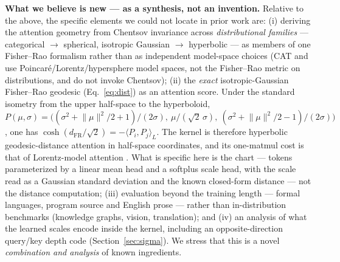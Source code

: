 \documentclass[11pt]{article}
\newcommand{\dFR}{d_{\mathrm{FR}}}
\begin{document}
\textbf{What we believe is new --- as a synthesis, not an invention.} Relative to the above, the specific elements we could not locate in prior work are: (i) deriving the attention geometry from Chentsov invariance across \emph{distributional families} --- categorical $\to$ spherical, isotropic Gaussian $\to$ hyperbolic --- as members of one Fisher--Rao formalism rather than as independent model-space choices (CAT and \cite{cho2023curve,he2025helm} use Poincar\'e/Lorentz/hypersphere model spaces, not the Fisher--Rao metric on distributions, and do not invoke Chentsov); (ii) the \emph{exact} isotropic-Gaussian Fisher--Rao geodesic (Eq.~\ref{eq:dist}) as an attention score. Under the standard isometry from the upper half-space to the hyperboloid, $P(\mu,\sigma) = \big((\sigma^2 + \lVert\mu\rVert^2/2 + 1)/(2\sigma),\ \mu/(\sqrt{2}\,\sigma),\ (\sigma^2 + \lVert\mu\rVert^2/2 - 1)/(2\sigma)\big)$, one has $\cosh(\dFR/\sqrt{2}) = -\langle P_i, P_j\rangle_L$. The kernel is therefore hyperbolic geodesic-distance attention in half-space coordinates, and its one-matmul cost is that of Lorentz-model attention \cite{gulcehre2019,nickel2018lorentz,chen2022fully}. What is specific here is the chart --- tokens parameterized by a linear mean head and a softplus scale head, with the scale read as a Gaussian standard deviation and the known closed-form distance \cite{costa2015} --- not the distance computation; (iii) evaluation beyond the training length --- formal languages, program source and English prose --- rather than in-distribution benchmarks (knowledge graphs, vision, translation); and (iv) an analysis of what the learned scales encode inside the kernel, including an opposite-direction query/key depth code (Section~\ref{sec:sigma}). We stress that this is a novel \emph{combination and analysis} of known ingredients.
\end{document}
